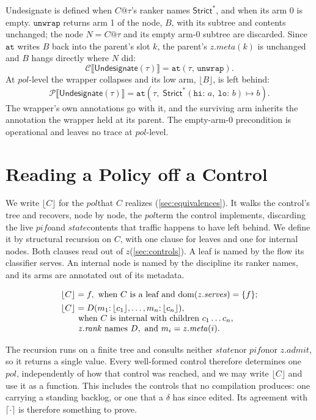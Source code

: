 \documentclass[sigplan,anonymous,review,nonacm]{acmart}
\newcommand{\csem}[1]{\mathcal{C}\llbracket #1 \rrbracket}
\newcommand{\psem}[1]{\mathcal{P}\llbracket #1 \rrbracket}
\newcommand{\notation}[1]{\ensuremath{#1}\ifmmode\else\xspace\fi}
\newcommand{\pol}{\notation{\mathit{pol}}}
\newcommand{\pifo}{\notation{\mathit{pifo}}}
\newcommand{\zz}{\notation{\mathit{z}}}
\newcommand{\stt}{\notation{\mathit{state}}}
\newcommand{\Strictstar}{\textsf{Strict}^{*}}
\newcommand{\Undesignate}{\textsf{Undesignate}}
\begin{document}
\Undesignate{} is defined when \(C@\tau\)'s ranker names \(\Strictstar\), and when its arm 0 is empty.
\(\mathtt{unwrap}\) returns arm 1 of the node, \(B\), with its subtree and contents unchanged; the node \(N = C@\tau\) and its empty arm-0 subtree are discarded.
Since \(\mathtt{at}\) writes \(B\) back into the parent's slot \(k\), the parent's \(\mathit{z}.\mathit{meta}(k)\) is unchanged and \(B\) hangs directly where \(N\) did:
\[
\csem{\Undesignate(\tau)} = \mathtt{at}(\tau,\, \mathtt{unwrap}).
\]
At \pol-level the wrapper collapses and its low arm, \(\lfloor B \rfloor\), is left behind:
\[
\psem{\Undesignate(\tau)} = \mathtt{at}(\tau,\; \Strictstar(\mathtt{hi}{:}\,a,\ \mathtt{lo}{:}\,b) \mapsto b).
\]
The wrapper's own annotations go with it, and the surviving arm inherits the annotation the wrapper held at its parent.
The empty-arm-0 precondition is operational and leaves no trace at \pol-level.

\section{Reading a Policy off a Control}\label{app:readback}

We write \(\lfloor C \rfloor\) for the \pol that \(C\) realizes (\cref{sec:equivalences}).
It walks the control's tree and recovers, node by node, the \pol term the control implements, discarding the live \pifo and \stt contents that traffic happens to have left behind.
We define it by structural recursion on \(C\), with one clause for leaves and one for internal nodes.
Both clauses read out of \zz (\cref{sec:controls}).
A leaf is named by the flow its classifier serves.
An internal node is named by the discipline its ranker names, and its arms are annotated out of its metadata.

\[
\begin{array}{@{}l@{}}
\lfloor C \rfloor = f,\ \text{when \(C\) is a leaf and } \mathrm{dom}(\mathit{z}.\mathit{serves}) = \{f\};\\[4pt]
\lfloor C \rfloor = D(m_1{:}\,\lfloor c_1 \rfloor, \ldots, m_n{:}\,\lfloor c_n \rfloor),\\
\qquad \text{when \(C\) is internal with children } c_1 \ldots c_n,\\
\qquad \mathit{z}.\mathit{rank} \text{ names } D, \text{ and } m_i = \mathit{z}.\mathit{meta}(i).
\end{array}
\]

The recursion runs on a finite tree and consults neither \stt nor \pifo nor \(\mathit{z}.\mathit{admit}\), so it returns a single value.
Every well-formed control therefore determines one \pol, independently of how that control was reached, and we may write \(\lfloor C \rfloor\) and use it as a function.
This includes the controls that no compilation produces: one carrying a standing backlog, or one that a \(\delta\) has since edited.
Its agreement with \(\lceil \cdot \rceil\) is therefore something to prove.
\end{document}
